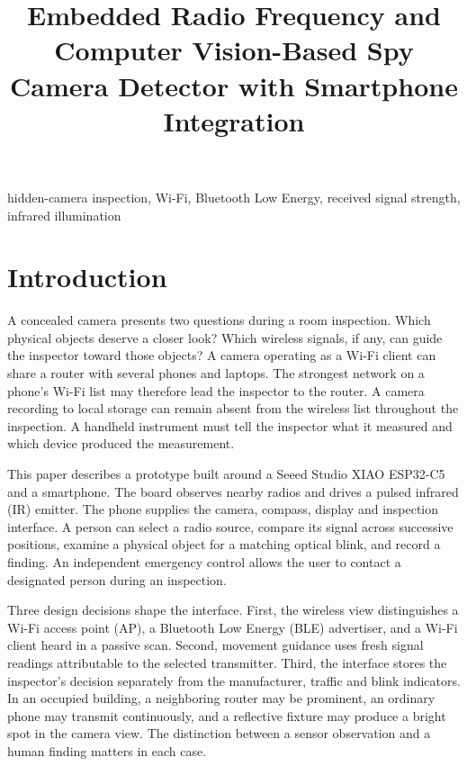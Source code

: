 \documentclass[conference]{IEEEtran}
\begin{document}
\title{Embedded Radio Frequency and Computer Vision-Based Spy Camera Detector with Smartphone Integration}
\author{
}
\maketitle

\begin{abstract}
\end{abstract}

\begin{IEEEkeywords}
hidden-camera inspection, Wi-Fi, Bluetooth Low Energy, received signal strength, infrared illumination
\end{IEEEkeywords}

\section{Introduction}
A concealed camera presents two questions during a room inspection. Which physical objects deserve a closer look? Which wireless signals, if any, can guide the inspector toward those objects? A camera operating as a Wi-Fi client can share a router with several phones and laptops. The strongest network on a phone's Wi-Fi list may therefore lead the inspector to the router. A camera recording to local storage can remain absent from the wireless list throughout the inspection. A handheld instrument must tell the inspector what it measured and which device produced the measurement.

This paper describes a prototype built around a Seeed Studio XIAO ESP32-C5 and a smartphone. The board observes nearby radios and drives a pulsed infrared (IR) emitter. The phone supplies the camera, compass, display and inspection interface. A person can select a radio source, compare its signal across successive positions, examine a physical object for a matching optical blink, and record a finding. An independent emergency control allows the user to contact a designated person during an inspection.

Three design decisions shape the interface. First, the wireless view distinguishes a Wi-Fi access point (AP), a Bluetooth Low Energy (BLE) advertiser, and a Wi-Fi client heard in a passive scan. Second, movement guidance uses fresh signal readings attributable to the selected transmitter. Third, the interface stores the inspector's decision separately from the manufacturer, traffic and blink indicators. In an occupied building, a neighboring router may be prominent, an ordinary phone may transmit continuously, and a reflective fixture may produce a bright spot in the camera view. The distinction between a sensor observation and a human finding matters in each case.
\end{document}

